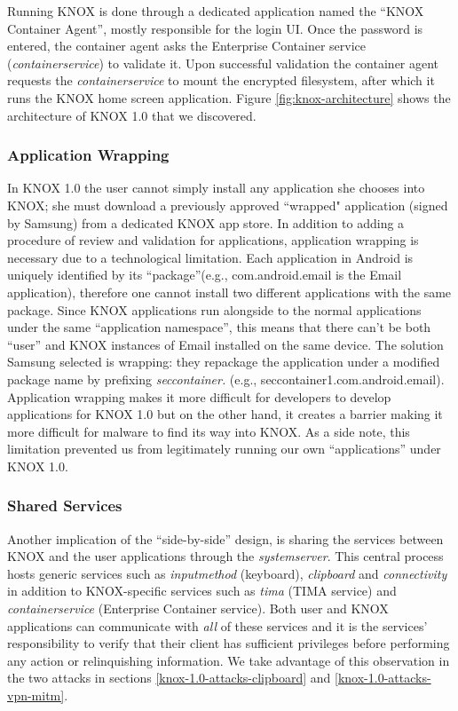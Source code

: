 \documentclass[11pt]{article}
\begin{document}
Running KNOX is done through a dedicated application named the ``KNOX Container Agent'', mostly responsible for the login UI.
Once the password is entered, the container agent asks the Enterprise Container service (\emph{container\textunderscore service}) to validate it. 
Upon successful validation the container agent requests the \emph{container\textunderscore service} to mount the encrypted filesystem, after which it runs 
the KNOX home screen application. Figure \ref{fig:knox-architecture} shows the architecture of KNOX 1.0 that we discovered. 

\subsubsection{Application Wrapping} \label{knox-1.0-app-wrapping}
In KNOX 1.0 the user cannot simply install any application she chooses into KNOX; she must download a previously approved
``wrapped" application (signed by Samsung) from a dedicated KNOX app store.
In addition to adding a procedure of review and validation for applications, application wrapping is necessary due to a technological limitation.
Each application in Android is uniquely identified by its ``package''(e.g., com.android.email is the Email application), therefore one cannot install 
two different applications with the same package. Since KNOX applications run alongside to the normal applications under 
the same ``application namespace'', this means that there can't be both ``user'' and KNOX instances of Email installed on the same device. 
The solution Samsung selected is wrapping: they repackage the application under a modified package name by prefixing 
\emph{sec\textunderscore container.} (e.g., sec\textunderscore container\textunderscore 1.com.android.email).
Application wrapping makes it more difficult for developers to develop applications for KNOX 1.0 but on the other hand, it creates a barrier 
making it more difficult for malware to find its way into KNOX. 
As a side note, this limitation prevented us from legitimately running our own ``applications'' under KNOX 1.0.

\subsubsection{Shared Services}
Another implication of the ``side-by-side'' design, is sharing the services between KNOX and the user applications through the 
\emph{system\textunderscore server}. 
This central process hosts generic services such as \emph{input\textunderscore method} (keyboard), \emph{clipboard} and \emph{connectivity} 
in addition to KNOX-specific services such as \emph{tima} (TIMA service) and \emph{container\textunderscore service} (Enterprise Container service). 
Both user and KNOX applications can communicate with \emph{all} of these services and it is the services' responsibility to verify that their 
client has sufficient privileges before performing any action or relinquishing information.
We take advantage of this observation in the two attacks in sections \ref{knox-1.0-attacks-clipboard} and \ref{knox-1.0-attacks-vpn-mitm}.
\end{document}
